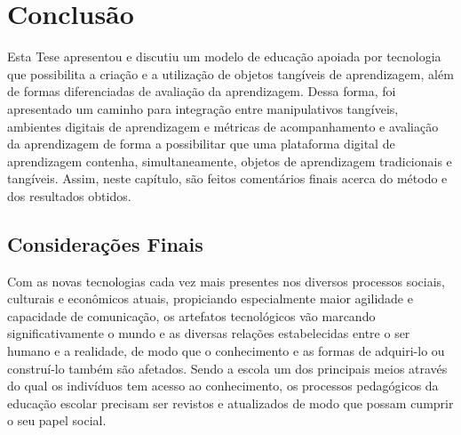 
\chapter{Conclusão} \label{Chap:endFuture}


Esta Tese apresentou e discutiu um modelo de educação apoiada por tecnologia que possibilita a criação e a utilização de objetos tangíveis de aprendizagem, além de formas diferenciadas de avaliação da aprendizagem. 
Dessa forma, foi apresentado um caminho para integração entre manipulativos tangíveis, ambientes digitais de aprendizagem e métricas de acompanhamento e avaliação da aprendizagem de forma a possibilitar que uma plataforma digital de aprendizagem contenha, simultaneamente, objetos de aprendizagem tradicionais e tangíveis. Assim, neste capítulo, 
são feitos comentários finais acerca do método e dos resultados obtidos.

\section{Considerações Finais}



Com as novas tecnologias cada vez mais presentes nos diversos processos sociais, culturais e econômicos atuais, propiciando especialmente maior agilidade e capacidade de comunicação, os artefatos tecnológicos vão marcando significativamente o mundo e as diversas relações estabelecidas entre o ser humano e a realidade, de modo que o conhecimento e as formas de adquiri-lo ou construí-lo também são afetados. Sendo a escola um dos principais meios através do qual os indivíduos tem acesso ao conhecimento, os processos pedagógicos da educação escolar precisam ser revistos e atualizados de modo que possam cumprir o seu papel social.

